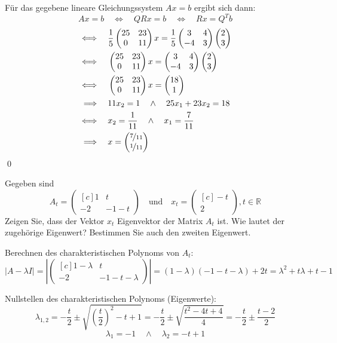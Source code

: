 \documentclass[answers]{exam}
\newcommand{\abs}[1]{\left| #1 \right|}
\newcommand{\vektor}[1]{\begin{pmatrix*}[c] #1 \end{pmatrix*}}
\newcommand{\R}{\mathbb{R}}
\begin{document}
\begin{questions}
\begin{solution}
        Für das gegebene lineare Gleichungssystem $Ax = b$ ergibt sich dann:
        $$
            Ax = b \quad \iff \quad QRx = b  \quad \iff \quad Rx = Q^Tb
        $$
        $$
            \begin{aligned}
                \iff \quad     & \frac{1}{5} \vektor{25                                  & 23 \\ 0 & 11}x = \frac{1}{5}\vektor{3 & 4 \\ -4 & 3}\vektor{2\\3} \\
                \iff \quad     & \vektor{25                                              & 23 \\ 0 & 11}x = \vektor{3 & 4 \\ -4 & 3}\vektor{2\\3} \\
                \iff \quad     & \vektor{25                                              & 23 \\ 0 & 11}x = \vektor{18 \\ 1} \\
                \implies \quad & 11x_2 = 1 \quad \land \quad 25x_1 + 23x_2 = 18               \\
                \iff \quad     & x_2 = \frac{1}{11} \quad \land \quad x_1 = \frac{7}{11}      \\
                \implies \quad & x = \vektor{\nicefrac{7}{11}                                 \\ \nicefrac{1}{11}}
            \end{aligned}
        $$\qed
    \end{solution}

    \newpage
    \question
    Gegeben sind
    $$
        A_t = \vektor{1 & t \\ -2 & -1-t} \quad \text{und} \quad x_t = \vektor{-t \\ 2}, t \in \R
    $$
    Zeigen Sie, dass der Vektor $x_t$ Eigenvektor der Matrix $A_t$ ist.
    Wie lautet der zugehörige Eigenwert?
    Bestimmen Sie auch den zweiten Eigenwert.
    \begin{solution}
        Berechnen des charakteristischen Polynoms von $A_t$:
        $$
            \abs{A - \lambda I} = \abs{\vektor{1 - \lambda & t \\ -2  & -1-t-\lambda}} = (1-\lambda)(-1-t-\lambda) + 2t = \lambda^2 + t\lambda + t - 1
        $$

        Nullstellen des charakteristischen Polynoms (Eigenwerte):
        $$
            \lambda_{1,2} = -\frac{t}{2} \pm \sqrt{\left(\frac{t}{2}\right)^2 - t + 1} = -\frac{t}{2} \pm \sqrt{\frac{t^2-4t + 4}{4}} = -\frac{t}{2} \pm \frac{t-2}{2}
        $$
        $$
            \lambda_1 = -1 \quad \land \quad \lambda_2 = -t +1
        $$


\end{solution}
\end{questions}
\end{document}
